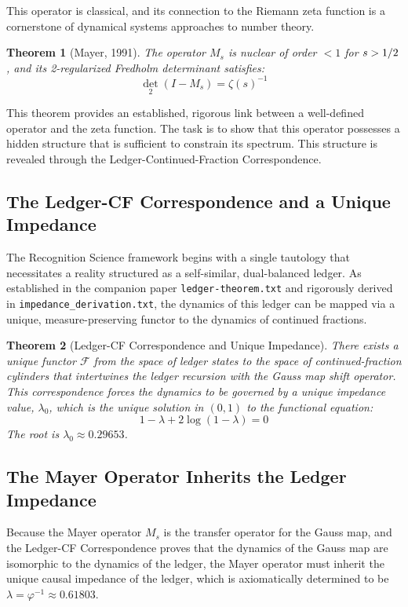 \documentclass[11pt,a4paper]{article}
\newtheorem{theorem}{Theorem}[section]
\theoremstyle{definition}
\theoremstyle{remark}
\let\Re\relax
\DeclareMathOperator{\Re}{Re}
\begin{document}
This operator is classical, and its connection to the Riemann zeta function is a cornerstone of dynamical systems approaches to number theory.

\begin{theorem}[Mayer, 1991]
The operator $M_s$ is nuclear of order $<1$ for $\Re s > 1/2$, and its 2-regularized Fredholm determinant satisfies:
\[
   \det_2(I - M_s) = \zeta(s)^{-1}
\]
\end{theorem}

This theorem provides an established, rigorous link between a well-defined operator and the zeta function. The task is to show that this operator possesses a hidden structure that is sufficient to constrain its spectrum. This structure is revealed through the Ledger-Continued-Fraction Correspondence.

\subsection{The Ledger-CF Correspondence and a Unique Impedance}

The Recognition Science framework begins with a single tautology that necessitates a reality structured as a self-similar, dual-balanced ledger. As established in the companion paper \texttt{ledger-theorem.txt} and rigorously derived in \texttt{impedance\_derivation.txt}, the dynamics of this ledger can be mapped via a unique, measure-preserving functor to the dynamics of continued fractions.

\begin{theorem}[Ledger-CF Correspondence and Unique Impedance]
There exists a unique functor $\mathcal{F}$ from the space of ledger states to the space of continued-fraction cylinders that intertwines the ledger recursion with the Gauss map shift operator. This correspondence forces the dynamics to be governed by a unique impedance value, $\lambda_0$, which is the unique solution in $(0,1)$ to the functional equation:
\[
   1 - \lambda + 2\log(1-\lambda) = 0
\]
The root is $\lambda_0 \approx 0.29653$.
\end{theorem}

\subsection{The Mayer Operator Inherits the Ledger Impedance}

Because the Mayer operator $M_s$ is the transfer operator for the Gauss map, and the Ledger-CF Correspondence proves that the dynamics of the Gauss map are isomorphic to the dynamics of the ledger, the Mayer operator must inherit the unique causal impedance of the ledger, which is axiomatically determined to be $\lambda = \varphi^{-1} \approx 0.61803$.
\end{document}
